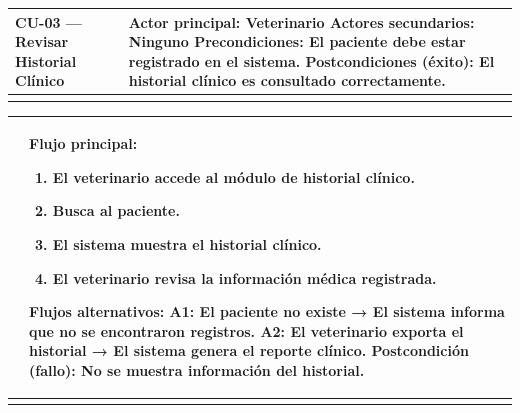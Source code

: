 \documentclass[
]{article}
\newcounter{none} %
\begin{document}
{\def\LTcaptype{none} %
\begin{longtable}[]{@{}
  >{\raggedright\arraybackslash}p{}
  >{\raggedright\arraybackslash}p{}@{}}
\toprule\noalign{}
\begin{minipage}[b]{\linewidth}\raggedright
CU-03 --- Revisar Historial Clínico
\end{minipage} & \begin{minipage}[b]{\linewidth}\raggedright
\textbf{Actor principal:} Veterinario \textbf{Actores secundarios:} Ninguno \textbf{Precondiciones:} El
paciente debe estar registrado en el sistema. \textbf{Postcondiciones (éxito):} El historial clínico es consultado
correctamente.
\end{minipage} \\
\midrule\noalign{}
\endhead
\bottomrule\noalign{}
\endlastfoot
\end{longtable}
}

{\def\LTcaptype{none} %
\begin{longtable}[]{@{}
  >{\raggedright\arraybackslash}p{}
  >{\raggedright\arraybackslash}p{}@{}}
\toprule\noalign{}
\begin{minipage}[b]{\linewidth}\raggedright
\end{minipage} & \begin{minipage}[b]{\linewidth}\raggedright
\textbf{Flujo principal:}

\begin{enumerate}
\def\labelenumi{\arabic{enumi}.}
\item
  El veterinario accede al módulo de historial clínico.
\item
  Busca al paciente.
\item
  El sistema muestra el historial clínico.
\item
  El veterinario revisa la información médica registrada.
\end{enumerate}

\textbf{Flujos alternativos:} A1: El paciente no existe → El sistema informa que no se encontraron
registros. A2: El veterinario exporta el historial → El sistema genera
el reporte clínico. \textbf{Postcondición (fallo):} No se muestra información del historial.
\end{minipage} \\
\midrule\noalign{}
\endhead
\bottomrule\noalign{}
\endlastfoot
\end{longtable}
}
\end{document}
